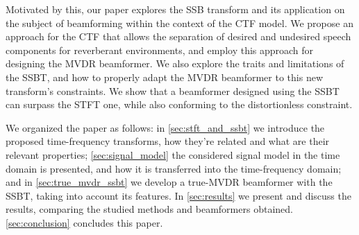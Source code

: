 Motivated by this, our paper explores the SSB transform and its application on the subject of beamforming within the context of the CTF model. We propose an approach for the CTF that allows the separation of desired and undesired speech components for reverberant environments, and employ this approach for designing the MVDR beamformer. We also explore the traits and limitations of the SSBT, and how to properly adapt the MVDR beamformer to this new transform's constraints. We show that a beamformer designed using the SSBT can surpass the STFT one, while also conforming to the distortionless constraint.

We organized the paper as follows:
in \cref{sec:stft_and_ssbt} we introduce the proposed time-frequency transforms, how they're related and what are their relevant properties;
\cref{sec:signal_model} the considered signal model in the time domain is presented, and how it is transferred into the time-frequency domain;
and in \cref{sec:true_mvdr_ssbt} we develop a true-MVDR beamformer with the SSBT, taking into account its features.
In \cref{sec:results} we present and discuss the results, comparing the studied methods and beamformers obtained.
\cref{sec:conclusion} concludes this paper.